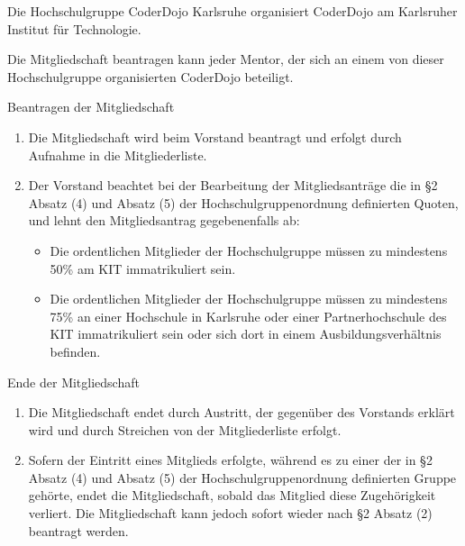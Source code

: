 \documentclass[a4paper, parskip=half, numbers=noenddot]{scrartcl}
\begin{document}
\begin{contract}
%
%


Die Hochschulgruppe CoderDojo Karlsruhe organisiert CoderDojo am Karlsruher
Institut für Technologie.


%
%


Die Mitgliedschaft beantragen kann jeder Mentor, der sich an einem von dieser
Hochschulgruppe organisierten CoderDojo beteiligt.

Beantragen der Mitgliedschaft
\begin{enumerate}
  \item Die Mitgliedschaft wird beim Vorstand beantragt und erfolgt durch
    Aufnahme in die Mitgliederliste.
  \item Der Vorstand beachtet bei der Bearbeitung der Mitgliedsanträge die in
    §2 Absatz (4) und Absatz (5) der Hochschulgruppenordnung definierten Quoten,
    und lehnt den Mitgliedsantrag gegebenenfalls ab:
    \begin{itemize}
      \item Die ordentlichen Mitglieder der Hochschulgruppe müssen zu mindestens 50\% am KIT immatrikuliert sein.
      \item Die ordentlichen Mitglieder der Hochschulgruppe müssen zu mindestens 75\% an einer Hochschule in Karlsruhe oder einer Partnerhochschule des KIT immatrikuliert sein oder sich dort in einem Ausbildungsverhältnis befinden.
    \end{itemize}
\end{enumerate}

Ende der Mitgliedschaft
\begin{enumerate}
  \item Die Mitgliedschaft endet durch Austritt, der gegenüber des Vorstands
    erklärt wird und durch Streichen von der Mitgliederliste erfolgt.
  \item Sofern der Eintritt eines Mitglieds erfolgte, während es zu einer der
    in §2 Absatz (4) und Absatz (5) der Hochschulgruppenordnung definierten
    Gruppe gehörte, endet die Mitgliedschaft, sobald das Mitglied diese
    Zugehörigkeit verliert.
    Die Mitgliedschaft kann jedoch sofort wieder nach §2 Absatz (2) beantragt
    werden.
\end{enumerate}



\end{contract}
\end{document}
